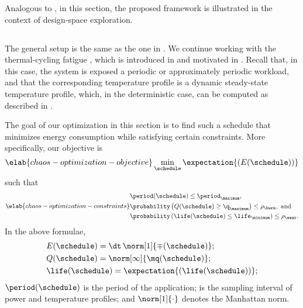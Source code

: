 Analogous to , in this section, the proposed
framework is illustrated in the context of design-space exploration.

\subsection{\problemtitle}

The general setup is the same as the one in . We
continue working with the thermal-cycling fatigue \cite{jedec2016}, which is
introduced in  and motivated in
. Recall that, in this case, the system is
exposed a periodic or approximately periodic workload, and that the
corresponding temperature profile is a dynamic steady-state temperature profile,
which, in the deterministic case, can be computed as described in
.

The goal of our optimization in this section is to find such a schedule
\schedule that minimizes energy consumption while satisfying certain
constraints. More specifically, our objective is
\begin{equation} \elab{chaos-optimization-objective}
  \min_{\schedule} \expectation{(E(\schedule))}
\end{equation}
such that
\begin{equation} \elab{chaos-optimization-constraints}
  \begin{split}
    & \period(\schedule) \leq \period_\maximum, \\
    & \probability\left(Q(\schedule) \geq \q_\maximum\right) \leq \rho_\burn, \text{ and} \\
    & \probability\left(\life(\schedule) \leq \life_\minimum\right) \leq \rho_\wear.
  \end{split}
\end{equation}
In the above formulae,
\begin{align*}
  & E(\schedule) = \dt \, \norm[1]{\mp(\schedule)}; \\
  & Q(\schedule) = \norm[\infty]{\mq(\schedule)}; \\
  & \life(\schedule) = \expectation{\left(\life(\schedule)\right)};
\end{align*}
$\period(\schedule)$ is the period of the application; \dt is the sampling
interval of power and temperature profiles; and $\norm[1]{\cdot}$ denotes the
Manhattan norm.

